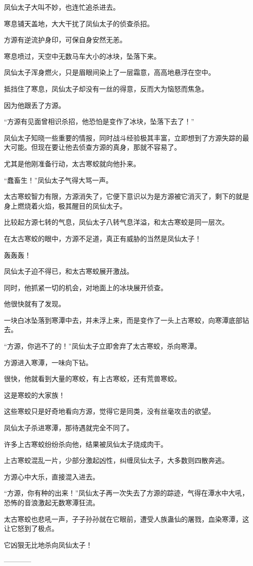 \begin{this_body}
凤仙太子大叫不妙，也连忙追杀进去。

寒息铺天盖地，大大干扰了凤仙太子的侦查杀招。

方源有逆流护身印，可保自身安然无恙。

寒息喷过，天空中无数马车大小的冰块，坠落下来。

凤仙太子浑身燃火，只是眉眼间染上了一层霜意，高高地悬浮在空中。

抵挡住了寒息，凤仙太子却没有一丝的得意，反而大为恼怒而焦急。

因为他跟丢了方源。

“方源有见面曾相识杀招，他恐怕是变作了冰块，坠落下去了！”

凤仙太子知晓一些重要的情报，同时战斗经验极其丰富，立即想到了方源失踪的最大可能。但现在要让他去侦查方源的真身，那就不容易了。

尤其是他刚准备行动，太古寒蛟就向他扑来。

“蠢畜生！”凤仙太子气得大骂一声。

太古寒蛟智力有限，方源消失了，它便下意识以为是方源被它消灭了，剩下的就是身上燃烧着火焰，极其醒目的凤仙太子。

比较起方源七转的气息，凤仙太子八转气息洋溢，和太古寒蛟是同一层次。

在太古寒蛟的眼中，方源不足道，真正有威胁的当然是凤仙太子！

轰轰轰！

凤仙太子迫不得已，和太古寒蛟展开激战。

同时，他抓紧一切的机会，对地面上的冰块展开侦查。

他很快就有了发现。

一块白冰坠落到寒潭中去，并未浮上来，而是变作了一头上古寒蛟，向寒潭底部钻去。

“方源，你逃不了的！”凤仙太子立即舍弃了太古寒蛟，杀向寒潭。

方源进入寒潭，一味向下钻。

很快，他就看到大量的寒蛟，有上古寒蛟，还有荒兽寒蛟。

这是寒蛟的大家族！

这些寒蛟只是好奇地看向方源，觉得它是同类，没有丝毫攻击的欲望。

凤仙太子杀进寒潭，那待遇就完全不同了。

许多上古寒蛟纷纷杀向他，结果被凤仙太子烧成肉干。

上古寒蛟混乱一片，少部分激起凶性，纠缠凤仙太子，大多数则四散奔逃。

方源心中大乐，直接混入进去。

“方源，你有种的出来！”凤仙太子再一次失去了方源的踪迹，气得在潭水中大吼，恐怖的音浪激起无数寒潭狂流。

太古寒蛟也悲吼一声，子子孙孙就在它眼前，遭受人族蛊仙的屠戮，血染寒潭，这让它怒到了极点。

它凶狠无比地杀向凤仙太子！

------------

\end{this_body}


